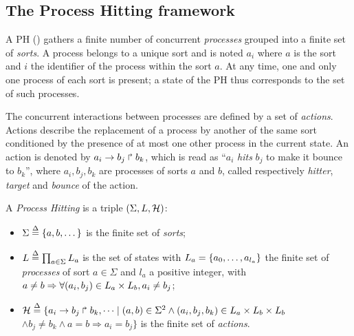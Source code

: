\subsection{The Process Hitting framework}
\label{ssec:PH}

A PH () gathers a finite number of concurrent \emph{processes}
grouped into a finite set of \emph{sorts}.
A process belongs to a unique sort and is noted $a_i$ where $a$ is the
sort and $i$ the identifier of the process within the sort $a$.
At any time, one and only one process of each sort is present; a state of the PH thus corresponds to the set of such processes.
 
The concurrent interactions between processes are defined by a set of
\emph{actions}.
Actions describe the replacement of a process by another of the same sort
conditioned by the presence of at most one other process in the current state.
An action is denoted by $a_i\rightarrow b_j\Rsh b_k$, which is read as
``$a_i$ \emph{hits} $b_j$ to make it bounce to $b_k$'',
where $a_i,b_j,b_k$ are processes of sorts $a$ and $b$,
called respectively \emph{hitter}, \emph{target} and
\emph{bounce} of the action.%

\begin{definition}\label{def:PH}
A \emph{Process Hitting} is a triple $(\Sigma,L,\mathcal{H})$:
\begin{itemize}
\item $\Sigma \stackrel{\Delta}= \{a,b,\dots\}$ is the finite set of \emph{sorts};
\item $L \stackrel{\Delta}= \prod_{a\in\Sigma} L_a$ is the set of states with $L_a = \{a_0,\dots,a_{l_a}\}$
the finite set of \emph{processes} of sort $a\in\Sigma$ and $l_a$ a positive integer, with
	$a\neq b\Rightarrow \forall(a_i,b_j)\in L_a\times L_b,a_i\neq b_j$;
\item $\mathcal{H} \stackrel{\Delta}= \{ a_i\rightarrow b_j\Rsh b_k, \dots \mid
					(a,b)\in\Sigma^2 \wedge (a_i,b_j,b_k)\in L_a\times L_b\times L_b$ \\
	\hspace*{2cm} $\wedge b_j\neq b_k \wedge a=b\Rightarrow a_i=b_j\}$
			is the finite set of \emph{actions}.
\end{itemize}
\end{definition}

